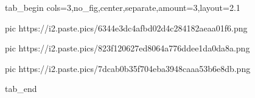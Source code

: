  
 
 
 
 


\ifcmt
  tab_begin cols=3,no_fig,center,separate,amount=3,layout=2.1

		 pic https://i2.paste.pics/6344e3dc4afbd02d4c284182aeaa01f6.png

		 pic https://i2.paste.pics/823f120627ed8064a776ddee1da0da8a.png

		 pic https://i2.paste.pics/7dcab0b35f704eba3948caaa53b6e8db.png

  tab_end
\fi
